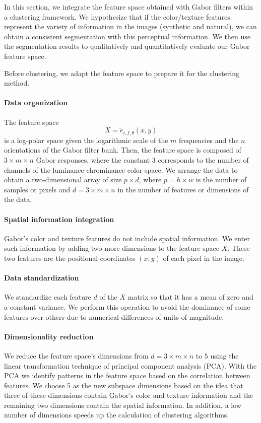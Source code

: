 In this section, we integrate the feature space obtained with Gabor filters within a clustering framework. We hypothesize that if the color/texture features represent the variety of information in the images (synthetic and natural), we can obtain a consistent segmentation with this perceptual information. We then use the segmentation results to qualitatively and quantitatively evaluate our Gabor feature space.

Before clustering, we adapt the feature space to prepare it for the clustering method.

\paragraph{Data organization}
The feature space 
\begin{equation}\label{eq:feature_space_clustering}
	X = \widetilde{e}_{i, f, \theta}(x,y)
\end{equation}
is a log-polar space given the logarithmic scale of the $m$ frequencies and the $n$ orientations of the Gabor filter bank. Then, the feature space is composed of $3 \times m \times n$ Gabor responses, where the constant $3$ corresponds to the number of channels of the luminance-chrominance color space. We arrange the data to obtain a two-dimensional array of size $p \times d$, where $p= h\times w$  is the number of samples or pixels and $d =3 \times m \times n$ in the number of features or dimensions of the data.

\paragraph{Spatial information integration}
Gabor's color and texture features do not include spatial information. We enter such information by adding two more dimensions to the feature space $X$. These two features are the positional coordinates $(x, y)$ of each pixel in the image. 

\paragraph{Data standardization}
We standardize each feature $d$ of the $X$ matrix so that it has a mean of zero and a constant variance. We perform this operation to avoid the dominance of some features over others due to numerical differences of units of magnitude.

\paragraph{Dimensionality reduction}
We reduce the feature space's dimensions from $d =3 \times m \times n$ to $5$ using the linear transformation technique of principal component analysis (PCA). With the PCA we identify patterns in the feature space based on the correlation between features. We choose 5 as the new subspace dimensions based on the idea that three of these dimensions contain Gabor's color and texture information and the remaining two dimensions contain the spatial information. In addition, a low number of dimensions speeds up the calculation of clustering algorithms.

